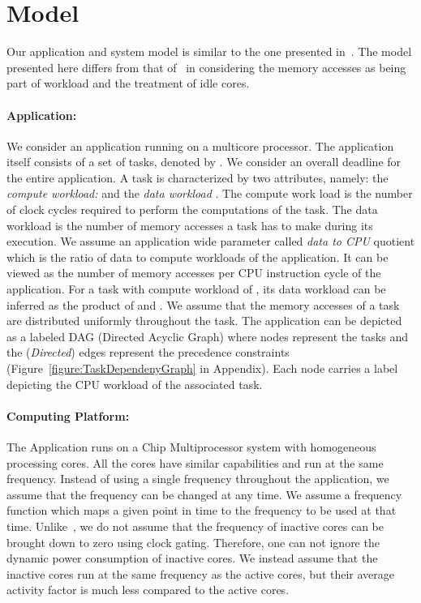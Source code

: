 \documentclass[11pt, letterpaper]{article}
\begin{document}
\section{Model}\label{Model}
Our application and system model is similar to the one presented in~\cite{ConvexAndScheduling}. 
The model presented here differs from that of~\cite{ConvexAndScheduling} in considering the memory accesses as being part of workload and the treatment of idle cores.
\paragraph{Application:}
We consider an application running on a multicore processor. The application itself consists of a set  of  tasks, denoted by . We consider an overall deadline  for the entire application. A task  is characterized by two attributes, namely: the \emph{compute workload:}  and the \emph{data workload} . The compute work load is the number of clock cycles required to perform the computations of the task. The data workload is the number of memory accesses a task has to make during its execution. We assume an application wide parameter called \emph{data to CPU} quotient  which is the ratio of data to compute workloads of the application. It can be viewed as the number of memory accesses per CPU instruction cycle of the application. For a task  with compute workload of , its data workload can be inferred as the product of  and . We assume that the memory accesses of a task are distributed uniformly throughout the task.
The application can be depicted as a labeled DAG (Directed Acyclic Graph) where nodes represent the tasks and the (\emph{Directed}) edges represent the precedence constraints (Figure~\ref{figure:TaskDependenyGraph} in Appendix). Each node carries a label depicting the CPU workload  of the associated task. 


\paragraph{Computing Platform:} The Application runs on a Chip Multiprocessor system with  homogeneous processing cores. All the cores have similar capabilities and run at the same frequency. Instead of using a single frequency throughout the application, we assume that the frequency can be changed at any time. We assume a frequency function  which maps a given point in time to the frequency to be used at that time. Unlike~\cite{ConvexAndScheduling}, we do not assume that the frequency of inactive cores can be brought down to zero using clock gating. Therefore, one can not ignore the dynamic power consumption of inactive cores. We instead assume that the inactive cores run at the same frequency as the active cores, but their average activity factor is much less compared to the active cores. 
\end{document}
